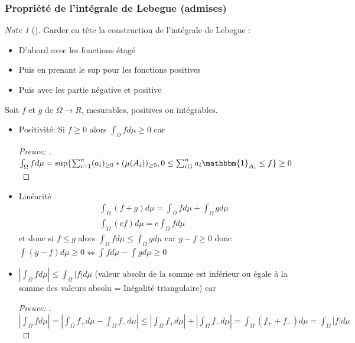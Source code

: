 \documentclass{article}
\theoremstyle{plain}%
\theoremstyle{definition}
\theoremstyle{remark}
\newtheorem*{note}{Note}
\begin{document}
\subsubsection{Propriété de l'intégrale de Lebegue (admises)}
\begin{note}[]
    Garder en tête la construction de l'intégrale de Lebegue : \begin{itemize}
        \item D'abord avec les fonctions étagé
        \item Puis en prenant le sup pour les fonctions positives
        \item Puis avec les partie négative et positive
    \end{itemize}
\end{note}
Soit $ f $ et $ g $ de $ \Omega \to R $, mesurables, positives ou intégrables. \begin{itemize}
    \item Positivité: Si $ f \geq 0 $ alors $\int_{\Omega }^{}fd \mu \geq 0$ car \begin{proof}[Preuve: ]
        $ \int_{\Omega }^{}fd \mu  = \sup \{\sum_{i=1}^{n}(a_i)_{\geq 0} * (\mu (A_i))_{\geq 0}, 0 \leq \sum_{i)1}^{n}a_i \mathbbm{1}_{A_i} \leq f\} \geq 0 $
    \end{proof}

    \item Linéarité \begin{align*}
        & \int_{\Omega }^{}(f+g) d \mu = \int_{\Omega }^{}fd \mu + \int_{\Omega }^{}gd \mu \\
        & \int_{\Omega }^{}(cf) d \mu = c \int_{\Omega }^{}fd \mu 
    \end{align*} 
        et donc si $ f \leq  g $ alors $ \int_{\Omega }^{}f d \mu \leq \int_{\Omega }^{}gd \mu  $ car $ g-f \geq 0 $ donc $ \int_{}^{}(g-f)d \mu \geq 0 \Leftrightarrow \int_{}^{}fd \mu - \int_{}^{}gd \mu \geq 0 $ 

    \item $ \left| \int_{\Omega }^{}f d \mu  \right| \leq \int_{\Omega }^{}\left| f \right| d \mu  $ (valeur absolu de la somme est inférieur ou égale à la somme des valeurs absolu = Inégalité triangulaire) car \begin{proof}[Preuve: ]
        $ \left| \int_{\Omega }^{}fd \mu  \right| = \left| \int_{\Omega }^{}f_+ d \mu - \int_{\Omega }^{}f_- d \mu  \right| \leq  \left| \int_{\Omega }^{} f_+ d \mu \right| + \left| \int_{\Omega }^{} f_- d \mu  \right| = \int_{\Omega }^{}(f_+ + f_- ) d \mu  = \int_{\Omega }^{}\left| f \right| d \mu  $ 
    \end{proof}
    

\end{itemize}
\end{document}
